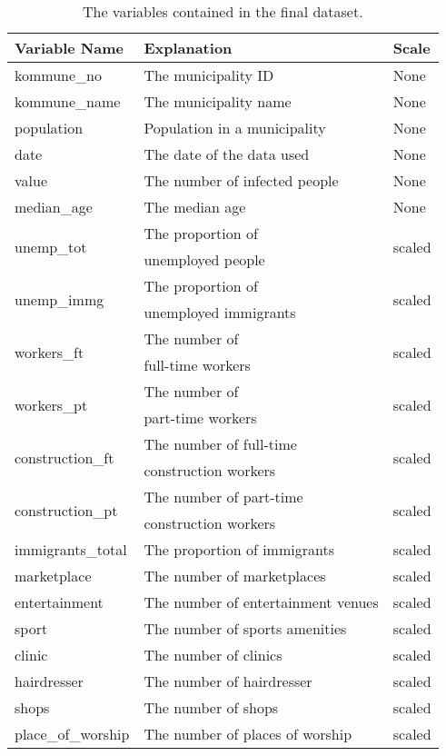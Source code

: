 \begin{table}[H] 
\caption{The variables contained in the final dataset.\label{datasetNorway}}
\begin{tabular}{l l l}
\toprule
\textbf{Variable Name}	& \textbf{Explanation}	& \textbf{Scale}\\
\midrule
kommune\_no & The municipality ID & None \\
kommune\_name & The municipality name & None \\
population & Population in a municipality & None \\
date & The date of the data used & None \\
value & The number of infected people & None \\
median\_age & The median age & None \\
\multirow{2}{*}{unemp\_tot} & The proportion of &\multirow{2}{*}{scaled}\\
& unemployed people \\
\multirow{2}{*}{unemp\_immg} & The proportion of & \multirow{2}{*}{scaled}\\
 & unemployed immigrants  \\
\multirow{2}{*}{workers\_ft} & The number of & \multirow{2}{*}{scaled} \\
& full-time workers \\
\multirow{2}{*}{workers\_pt} & The number of & \multirow{2}{*}{scaled} \\
& part-time workers \\
\multirow{2}{*}{construction\_ft} & The number of full-time & \multirow{2}{*}{scaled} \\
& construction workers \\
\multirow{2}{*}{construction\_pt} & The number of part-time & \multirow{2}{*}{scaled} \\
& construction workers \\
immigrants\_total & The proportion of immigrants  & scaled \\
marketplace & The number of marketplaces & scaled \\
entertainment & The number of entertainment venues & scaled \\
sport & The number of sports amenities & scaled \\
clinic & The number of clinics & scaled \\
hairdresser & The number of hairdresser & scaled \\
shops & The number of shops & scaled \\
place\_of\_worship & The number of places of worship & scaled \\

\end{tabular}
\end{table}
